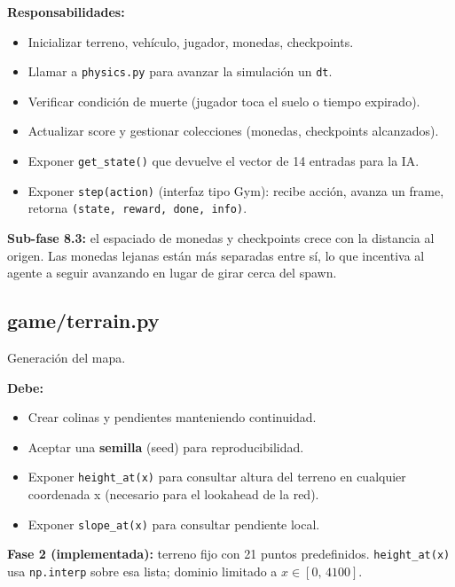 \documentclass[11pt,a4paper]{article}
\begin{document}
\textbf{Responsabilidades:}
\begin{itemize}
    \item Inicializar terreno, vehículo, jugador, monedas, checkpoints.
    \item Llamar a \texttt{physics.py} para avanzar la simulación un \texttt{dt}.
    \item Verificar condición de muerte (jugador toca el suelo o tiempo expirado).
    \item Actualizar score y gestionar colecciones (monedas, checkpoints alcanzados).
    \item Exponer \texttt{get\_state()} que devuelve el vector de 14 entradas para la IA.
    \item Exponer \texttt{step(action)} (interfaz tipo Gym): recibe acción, avanza un frame, retorna \texttt{(state, reward, done, info)}.
\end{itemize}

\textbf{Sub-fase 8.3:} el espaciado de monedas y checkpoints crece con la
distancia al origen. Las monedas lejanas están más separadas entre sí, lo que
incentiva al agente a seguir avanzando en lugar de girar cerca del spawn.

\subsection{game/terrain.py}

Generación del mapa.

\textbf{Debe:}
\begin{itemize}
    \item Crear colinas y pendientes manteniendo continuidad.
    \item Aceptar una \textbf{semilla} (seed) para reproducibilidad.
    \item Exponer \texttt{height\_at(x)} para consultar altura del terreno en cualquier coordenada x (necesario para el lookahead de la red).
    \item Exponer \texttt{slope\_at(x)} para consultar pendiente local.
\end{itemize}

\textbf{Fase 2 (implementada):} terreno fijo con 21 puntos predefinidos.
\texttt{height\_at(x)} usa \texttt{np.interp} sobre esa lista; dominio limitado a
$x \in [0,\,4100]$.
\end{document}
